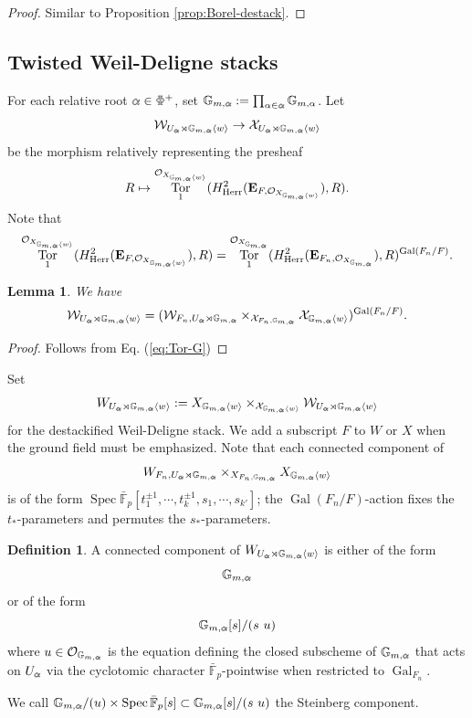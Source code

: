 \documentclass[11pt]{amsart}
\newtheorem{lem}[thm]{Lemma}
\theoremstyle{definition}
\newtheorem{defn}[thm]{Definition}
\newcommand{\doublestroke}[1]{\pdfliteral{1 Tr .3 w}#1\pdfliteral{0 Tr 0 w}}
\newcommand{\BPhi}{\doublestroke{\Phi}}
\newcommand{\Balpha}{\doublestroke{\alpha}}
\newcommand{\G}{\mathbb{G}}
\newcommand{\bfE}{\mathbf{E}}
\newcommand{\bFp}{\bar{\mathbb{F}}_p}
\newcommand{\cO}{\mathcal{O}}
\newcommand{\cX}{\mathcal{X}}
\newcommand{\cW}{\mathcal{W}}
\DeclareMathOperator{\Spec}{Spec}
\DeclareMathOperator{\Tor}{Tor}
\DeclareMathOperator{\Gal}{Gal}
\newcommand{\Herr}{\mathrm{Herr}}
\begin{document}
\begin{proof}
Similar to Proposition 
\ref{prop:Borel-destack}.
\end{proof}

\subsection{Twisted Weil-Deligne stacks}

For each relative root $\Balpha\in \BPhi^+$,
set
$\G_{m,\Balpha}
:=
\prod_{\alpha\in \Balpha}\G_{m, \alpha}
$.
Let
\[
\cW_{U_{\Balpha}\rtimes \G_{m,\Balpha} \langle w\rangle}
\to
\cX_{U_{\Balpha}\rtimes \G_{m,\Balpha} \langle w\rangle}
\]
be the morphism
relatively representing
the presheaf
\[
R\mapsto
\Tor_1^{\cO_{X_{\G_{m,\Balpha} \langle w\rangle}}}(H^2_\Herr(\bfE_{F, \cO_{X_{\G_{m,\Balpha} \langle w\rangle}}}), R).
\]
Note that
\begin{align}
\label{eq:Tor-G}
\Tor_1^{\cO_{X_{\G_{m,\Balpha} \langle w\rangle}}}(H^2_\Herr(\bfE_{F, \cO_{X_{\G_{m,\Balpha} \langle w\rangle}}}), R)
=
\Tor_1^{\cO_{X_{\G_{m,\Balpha}}}}(H^2_\Herr(\bfE_{F_n, \cO_{X_{\G_{m,\Balpha}}}}), R)^{\Gal(F_n/F)}.
\end{align}

\begin{lem}
We have
\[
\cW_{U_{\Balpha}\rtimes \G_{m,\Balpha} \langle w\rangle}
=
(\cW_{F_n, U_{\Balpha}\rtimes \G_{m,\Balpha}}
\times_{\cX_{F_n,\G_{m,\Balpha}}}
\cX_{\G_{m,\Balpha} \langle w\rangle})^{\Gal(F_n/F)}.
\]
\end{lem}
\begin{proof}
Follows from Eq. (\ref{eq:Tor-G})
\end{proof}

Set
\[
W_{U_{\Balpha}\rtimes\G_{m,\Balpha}\langle w\rangle}
:=X_{\G_{m,\Balpha}\langle w\rangle}
\times_{\cX_{\G_{m,\Balpha}\langle w\rangle}}
\cW_{U_{\Balpha}\rtimes\G_{m,\Balpha}\langle w\rangle}
\]
for the destackified Weil-Deligne stack. We add a subscript $F$ to $W$ or $X$
when the ground field must be emphasized.
Note that each connected component of
\[
W_{F_n, U_{\Balpha}\rtimes \G_{m,\Balpha}}
\times_{X_{F_n,\G_{m,\Balpha}}}
X_{\G_{m,\Balpha} \langle w\rangle}
\]
is of the form $\Spec \bFp[t_1^{\pm1}, \cdots, t_k^{\pm1},
s_1, \cdots, s_{k'}]$;
the $\Gal(F_n/F)$-action
fixes the $t_*$-parameters
and permutes the $s_*$-parameters.

\begin{defn}
A connected component of 
$W_{U_{\Balpha}\rtimes \G_{m,\Balpha} \langle w\rangle}$
is either of the form
\[
\G_{m, \Balpha}
\]
or of the form
\[
\G_{m, \Balpha} [s]/(s~u)
\]
where $u\in \cO_{\G_{m,\Balpha}}$
is the equation defining the closed subscheme
of $\G_{m,\Balpha}$
that acts on $U_{\Balpha}$
via the cyclotomic character
$\bFp$-pointwise
when restricted to $\Gal_{F_n}$.

We call $\G_{m,\Balpha}/(u) \times \Spec \bFp[s]
\subset \G_{m, \Balpha} [s]/(s~u)$
the Steinberg component.
\end{defn}
\end{document}
